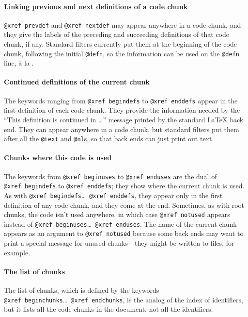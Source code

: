 \documentclass{article}
\makeatletter
\newcommand\kw[1]{\texttt{@#1}}
\newcommand\xkw[1]{\kw{xref~#1}}
\newcommand\xkws[2]{\xkw{#1}\hbox{\thinspace}\ldots~\xkw{#2}}
\makeatother
\begin{document}
\paragraph{Linking previous and next definitions of a code chunk}

\xkw{prevdef} and \xkw{nextdef} may appear anywhere in a code chunk,
and they give the labels of the preceding and succeeding definitions
of that code chunk, if any.
Standard filters currently put them at the beginning of the code
chunk, following the initial \kw{defn}, so the information can be used
on the \kw{defn} line,
\`a la .


\paragraph{Continued definitions of the current chunk}

The keywords ranging from \xkw{begindefs} to \xkw{enddefs} appear in the first
definition of each code chunk.
They provide the information needed by the ``This definition is
continued in \ldots'' message printed by the standard {\LaTeX} back
end.
They can appear anywhere in a code chunk, but standard filters put
them after all the \kw{text} and \kw{nl}s, so that back ends can just
print out text.


\paragraph{Chunks where this code is used}

The keywords from \xkw{beginuses} to \xkw{enduses} are the dual of
\xkw{begindefs} to \xkw{enddefs}; they show where the current chunk is
used.
As with \xkws{begindefs}{enddefs}, they appear only in the first
definition of any code chunk, and they come at the end.
Sometimes, as with root chunks, the code isn't used anywhere, in which
case \xkw{notused} appears instead of \xkws{beginuses}{enduses}.
The name of the current chunk appears as an argument to \xkw{notused}
because some back ends may want to print a special message for unused
chunks---they might be written to files, for example.

\paragraph{The list of chunks}

The list of chunks, which is defined by the keywords
\xkws{beginchunks}{endchunks}, is the
analog of the index of identifiers, but it lists all the code chunks
in the document, not all the identifiers.
\end{document}
